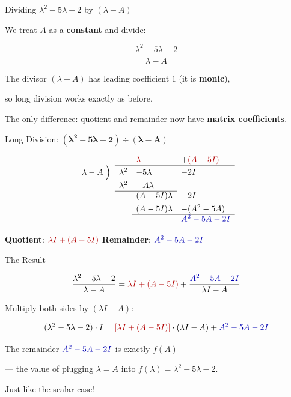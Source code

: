 \documentclass[10pt]{beamer}
\theoremstyle{definition}
\newcommand{\x}[1]{\alert{\textbf{#1}}}
\newcommand{\rd}[1]{{\color{red!70!black}#1}}
\newcommand{\bl}[1]{{\color{blue!70!black}#1}}
\begin{document}
\begin{frame}{Dividing $\lambda^2 - 5\lambda - 2$ by $(\lambda - A)$}

\vfill

We treat $A$ as a \x{constant} and divide:

$$\frac{\lambda^2 - 5\lambda - 2}{\lambda - A}$$

\vfill

The divisor $(\lambda - A)$ has leading coefficient $1$ (it is \x{monic}),

so long division works exactly as before.

\vfill

The only difference: quotient and remainder now have \x{matrix coefficients}.

\vfill
\end{frame}


\begin{frame}{Long Division: $\boldsymbol{(\lambda^2 - 5\lambda - 2) \div (\lambda - A)}$}

\vfill

$$\begin{array}{rlll}
&&{\color{red!70!black} \lambda}&+{\color{red!70!black}(A-5I)}\\
    \cline{2-4}
    \lambda-A \;\Big)& \lambda^2 & -5\lambda  & -2I \\[4pt]
    & \lambda^2 & -A\lambda &  \\
    \cline{2-3}
    &  & (A-5I)\lambda & -2I  \\[4pt]
    &   & (A-5I)\lambda & -(A^2-5A)  \\
    \cline{3-4}
    &   &  & {\color{blue!70!black}A^2-5A-2I}  \\
\end{array}$$

\vfill

\x{Quotient}: $\rd{\lambda I + (A - 5I)}$ \hfill
\x{Remainder}: $\bl{A^2 - 5A - 2I}$

\vfill
\end{frame}


\begin{frame}{The Result}

$$\frac{\lambda^2 - 5\lambda - 2}{\lambda - A} = \rd{\lambda I + (A-5I)} + \frac{\bl{A^2 - 5A - 2I}}{\lambda I - A}$$

\vfill

Multiply both sides by $(\lambda I - A)$:

$$(\lambda^2 - 5\lambda - 2) \cdot I = \rd{[\lambda I + (A-5I)]} \cdot (\lambda I - A) + \bl{A^2 - 5A - 2I}$$

\vfill

The remainder $\bl{A^2 - 5A - 2I}$ is exactly $f(A)$

--- the value of plugging $\lambda = A$ into $f(\lambda) = \lambda^2 - 5\lambda - 2$.

\vfill

Just like the scalar case!

\vfill
\end{frame}
\end{document}
